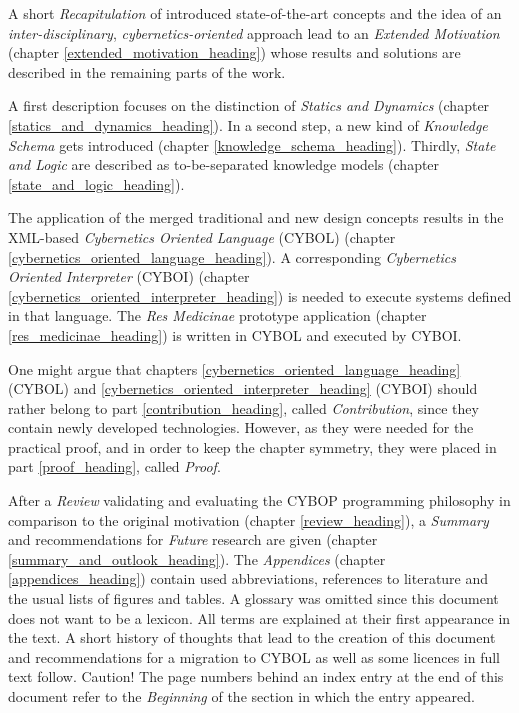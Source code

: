 A short \emph{Recapitulation} of introduced state-of-the-art concepts and the
idea of an \emph{inter-disciplinary}, \emph{cybernetics-oriented} approach lead
to an \emph{Extended Motivation} (chapter \ref{extended_motivation_heading})
whose results and solutions are described in the remaining parts of the work.

A first description focuses on the distinction of \emph{Statics and Dynamics}
(chapter \ref{statics_and_dynamics_heading}). In a second step, a new kind of
\emph{Knowledge Schema} gets introduced (chapter \ref{knowledge_schema_heading}).
Thirdly, \emph{State and Logic} are described as to-be-separated knowledge
models (chapter \ref{state_and_logic_heading}).

The application of the merged traditional and new design concepts results in
the XML-based \emph{Cybernetics Oriented Language} (CYBOL) (chapter
\ref{cybernetics_oriented_language_heading}). A corresponding
\emph{Cybernetics Oriented Interpreter} (CYBOI) (chapter
\ref{cybernetics_oriented_interpreter_heading}) is needed to execute systems
defined in that language. The \emph{Res Medicinae} prototype application
(chapter \ref{res_medicinae_heading}) is written in CYBOL and executed by
CYBOI.

One might argue that chapters \ref{cybernetics_oriented_language_heading}
(CYBOL) and \ref{cybernetics_oriented_interpreter_heading} (CYBOI) should
rather belong to part \ref{contribution_heading}, called \emph{Contribution},
since they contain newly developed technologies. However, as they were needed
for the practical proof, and in order to keep the chapter symmetry, they were
placed in part \ref{proof_heading}, called \emph{Proof}.

After a \emph{Review} validating and evaluating the CYBOP programming philosophy
in comparison to the original motivation (chapter \ref{review_heading}), a
\emph{Summary} and recommendations for \emph{Future} research are given
(chapter \ref{summary_and_outlook_heading}). The \emph{Appendices} (chapter
\ref{appendices_heading}) contain used abbreviations, references to literature
and the usual lists of figures and tables. A glossary was omitted since this
document does not want to be a lexicon. All terms are explained at their first
appearance in the text. A short history of thoughts that lead to the creation
of this document and recommendations for a migration to CYBOL as well as some
licences in full text follow. Caution! The page numbers behind an index entry
at the end of this document refer to the \emph{Beginning} of the section in
which the entry appeared.

